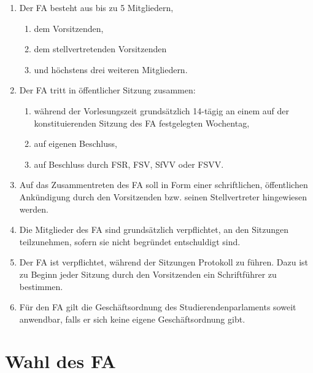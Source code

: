 \documentclass{article}
\providecommand{\tightlist}{\setlength{\itemsep}{0pt}\setlength{\parskip}{0pt}}
\begin{document}
\begin{enumerate}[(1)]
	\item Der FA besteht aus bis zu 5 Mitgliedern,
	\begin{enumerate}[1.]
		\tightlist
		\item dem Vorsitzenden,
		\item dem stellvertretenden Vorsitzenden
		\item und höchstens drei weiteren Mitgliedern.
	\end{enumerate}
	\item Der FA tritt in öffentlicher Sitzung zusammen:
	\begin{enumerate}
		\tightlist
		\item während der Vorlesungszeit grundsätzlich 14-tägig an einem auf der konstituierenden Sitzung des FA festgelegten Wochentag,
		\item auf eigenen Beschluss,
		\item auf Beschluss durch FSR, FSV, SfVV oder FSVV.
	\end{enumerate}
	\item Auf das Zusammentreten des FA soll in Form einer schriftlichen, öffentlichen Ankündigung durch den Vorsitzenden bzw. seinen Stellvertreter hingewiesen werden.
	\item Die Mitglieder des FA sind grundsätzlich verpflichtet, an den Sitzungen teilzunehmen, sofern sie nicht begründet entschuldigt sind.
	\item Der FA ist verpflichtet, während der Sitzungen Protokoll zu führen. Dazu ist zu Beginn jeder Sitzung durch den Vorsitzenden ein Schriftführer zu bestimmen.
	\item Für den FA gilt die Geschäftsordnung des Studierendenparlaments soweit anwendbar, falls er sich keine eigene Geschäftsordnung gibt.
\end{enumerate}

\section{Wahl des FA}\label{wahl-des-fa}
\end{document}
